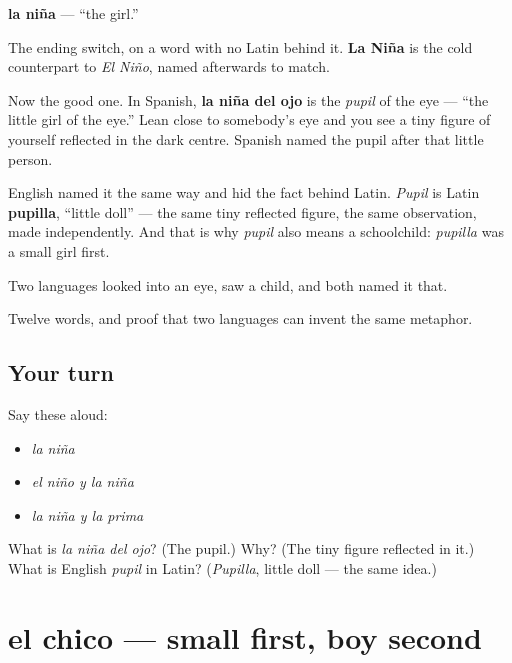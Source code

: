 \begin{cousinweb}
\textbf{la niña} --- \textquotedblleft{}the girl.\textquotedblright{}

The ending switch, on a word with no Latin behind it. \textbf{La Niña} is the cold counterpart to \emph{El Niño}, named afterwards to match.

Now the good one. In Spanish, \textbf{la niña del ojo} is the \emph{pupil} of the eye --- \textquotedblleft{}the little girl of the eye.\textquotedblright{} Lean close to somebody's eye and you see a tiny figure of yourself reflected in the dark centre. Spanish named the pupil after that little person.

English named it the same way and hid the fact behind Latin. \emph{Pupil} is Latin \textbf{pupilla}, \textquotedblleft{}little doll\textquotedblright{} --- the same tiny reflected figure, the same observation, made independently. And that is why \emph{pupil} also means a schoolchild: \emph{pupilla} was a small girl first.

Two languages looked into an eye, saw a child, and both named it that.
\end{cousinweb}

\begin{grammarlens}[title={What you've built}]
Twelve words, and proof that two languages can invent the same metaphor.
\end{grammarlens}

\subsection*{Your turn}
Say these aloud:

\begin{itemize}
\raggedright
  \item \emph{la niña}
  \item \emph{el niño y la niña}
  \item \emph{la niña y la prima}
\end{itemize}

\begin{tcolorbox}[breakable,colback=teal!4,colframe=teal!35!black,title={Before you move on}]
What is \emph{la niña del ojo}? (The pupil.) Why? (The tiny figure reflected in it.) What is English \emph{pupil} in Latin? (\emph{Pupilla}, little doll --- the same idea.)
\end{tcolorbox}
\section[el chico]{el chico --- small first, boy second}

